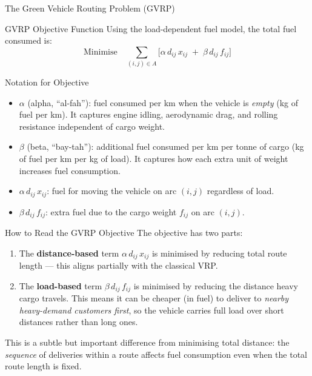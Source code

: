 \documentclass[aspectratio=169,10pt]{beamer}
\begin{document}
\begin{frame}[allowframebreaks]{The Green Vehicle Routing Problem (GVRP)}
  \framebreak

  \begin{block}{GVRP Objective Function}
    Using the load-dependent fuel model, the total fuel consumed is:
    \[
      \text{Minimise} \quad
      \sum_{(i,j)\in A} \bigl[\alpha\, d_{ij}\, x_{ij} \;+\; \beta\, d_{ij}\, f_{ij}\bigr]
    \]
  \end{block}

  \begin{block}{Notation for Objective}
    \begin{itemize}
      \item $\alpha$ (alpha, ``al-fah''): fuel consumed per km when the vehicle
      is \emph{empty} (kg of fuel per km).  It captures engine idling,
      aerodynamic drag, and rolling resistance independent of cargo weight.
      \item $\beta$ (beta, ``bay-tah''): additional fuel consumed per km per
      tonne of cargo (kg of fuel per km per kg of load).  It captures how each
      extra unit of weight increases fuel consumption.
      \item $\alpha\, d_{ij}\, x_{ij}$: fuel for moving the vehicle on arc
      $(i,j)$ regardless of load.
      \item $\beta\, d_{ij}\, f_{ij}$: extra fuel due to the cargo weight
      $f_{ij}$ on arc $(i,j)$.
    \end{itemize}
  \end{block}

  \framebreak

  \begin{alertblock}{How to Read the GVRP Objective}
    The objective has two parts:
    \begin{enumerate}
      \item The \textbf{distance-based} term $\alpha\, d_{ij}\, x_{ij}$ is
      minimised by reducing total route length --- this aligns partially with the
      classical VRP.
      \item The \textbf{load-based} term $\beta\, d_{ij}\, f_{ij}$ is minimised
      by reducing the distance heavy cargo travels.  This means it can be cheaper
      (in fuel) to deliver to \emph{nearby heavy-demand customers first}, so the
      vehicle carries full load over short distances rather than long ones.
    \end{enumerate}
    This is a subtle but important difference from minimising total distance:
    the \emph{sequence} of deliveries within a route affects fuel consumption
    even when the total route length is fixed.
  \end{alertblock}


\end{frame}
\end{document}
